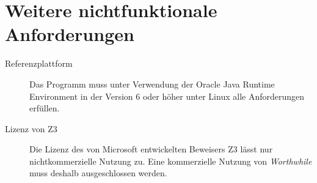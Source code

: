 \section{Weitere nichtfunktionale Anforderungen}%

\begin{description}%
    \item [Referenzplattform] Das Programm muss unter Verwendung der Oracle Java Runtime Environment in der Version 6 oder höher unter Linux alle Anforderungen erfüllen.
    \item [Lizenz von Z3] Die Lizenz des von Microsoft entwickelten Beweisers Z3 lässt nur nichtkommerzielle Nutzung zu. Eine kommerzielle Nutzung von \emph{Worthwhile} muss deshalb ausgeschlossen werden.
\end{description}
